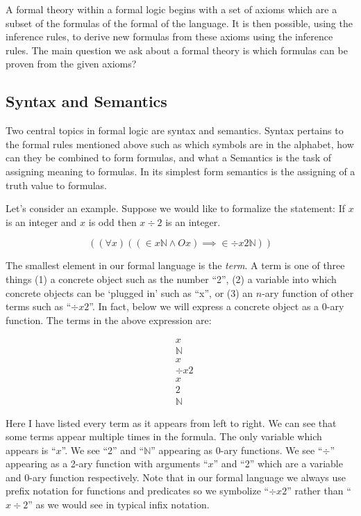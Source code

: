 \documentclass[12pt]{article}
\theoremstyle{break}
\theoremstyle{break}
\theoremstyle{break}
\theoremstyle{break}
\theoremstyle{break}
\newtheorem{informal definition}[definition]{Informal Definition}
\newcommand{\qq}[1]{``#1''}
\begin{document}
A formal theory within a formal logic begins with a set of axioms which are a subset of the formulas of the formal of the language.
It is then possible, using the inference rules, to derive new formulas from these axioms using the inference rules.
The main question we ask about a formal theory is which formulas can be proven from the given axioms?

\subsection{Syntax and Semantics}
Two central topics in formal logic are syntax and semantics.
Syntax pertains to the formal rules mentioned above such as which symbols are in the alphabet, how can they be combined to form formulas, and what a
Semantics is the task of assigning meaning to formulas.
In its simplest form semantics is the assigning of a truth value to formulas.

Let's consider an example.
Suppose we would like to formalize the statement: If $x$ is an integer and $x$ is odd then $x \div 2$ is an integer.

$$
((\forall x)((\in x \mathbb{N} \land Ox)\implies \in \div x 2 \mathbb{N}))
$$

The smallest element in our formal language is the \textit{term}.
A term is one of three things (1) a concrete object such as the number \qq{2}, (2) a variable into which concrete objects can be `plugged in' such as \qq{x}, or (3) an $n$-ary function of other terms such as \qq{$\div x2$}.
In fact, below we will express a concrete object as a 0-ary function.
The terms in the above expression are:

\begin{align*}
& x \\
& \mathbb{N} \\
& x \\
& \div x 2 \\
& x \\
& 2 \\
& \mathbb{N}
\end{align*}

Here I have listed every term as it appears from left to right.
We can see that some terms appear multiple times in the formula.
The only variable which appears is \qq{$x$}.
We see \qq{2} and \qq{$\mathbb{N}$} appearing as 0-ary functions.
We see \qq{$\div$} appearing as a 2-ary function with arguments \qq{$x$} and \qq{2} which are a variable and 0-ary function respectively.
Note that in our formal language we always use prefix notation for functions and predicates so we symbolize \qq{$\div x2$} rather than \qq{$x \div 2$} as we would see in typical infix notation.
\end{document}
